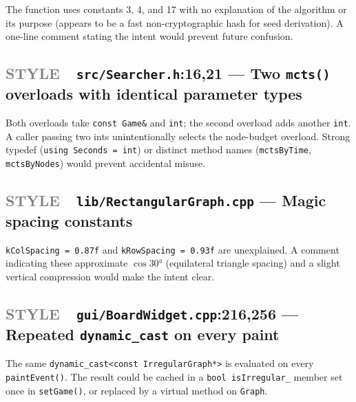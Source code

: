 \documentclass[11pt,letterpaper]{article}
\newcommand{\file}[1]{\texttt{#1}}
\newcommand{\code}[1]{\texttt{#1}}
\newcommand{\style}{\textcolor{gray}{\textbf{STYLE}}}
\begin{document}
The function uses constants 3, 4, and 17 with no explanation of the
algorithm or its purpose (appears to be a fast non-cryptographic hash for
seed derivation).  A one-line comment stating the intent would prevent
future confusion.

\subsection{\style\ \ \file{src/Searcher.h}:16,21 — Two \code{mcts()} overloads with identical parameter types}

Both overloads take \code{const Game\&} and \code{int}; the second overload
adds another \code{int}.  A caller passing two ints unintentionally selects
the node-budget overload.  Strong typedef (\code{using Seconds = int}) or
distinct method names (\code{mctsByTime}, \code{mctsByNodes}) would prevent
accidental misuse.

\subsection{\style\ \ \file{lib/RectangularGraph.cpp} — Magic spacing constants}

\code{kColSpacing = 0.87f} and \code{kRowSpacing = 0.93f} are
unexplained.  A comment indicating these approximate
$\cos 30°$ (equilateral triangle spacing) and a slight vertical compression
would make the intent clear.

\subsection{\style\ \ \file{gui/BoardWidget.cpp}:216,256 — Repeated \code{dynamic\_cast} on every paint}

The same \code{dynamic\_cast<const IrregularGraph*>} is evaluated on every
\code{paintEvent()}.  The result could be cached in a \code{bool isIrregular\_}
member set once in \code{setGame()}, or replaced by a virtual method on
\code{Graph}.
\end{document}
